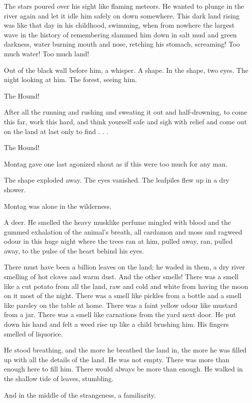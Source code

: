 \documentclass[11pt,openany]{book}
\begin{document}
The stars poured over his sight like flaming meteors. He wanted to plunge in the river again and let it idle him safely on down somewhere. This dark land rising was like that day in his childhood, swimming, when from nowhere the largest wave in the history of remembering slammed him down in salt mud and green darkness, water burning mouth and nose, retching his stomach, screaming! Too much water! Too much land!

Out of the black wall before him, a whisper. A shape. In the shape, two eyes. The night looking at him. The forest, seeing him.

The Hound!

After all the running and rushing and sweating it out and half-drowning, to come this far, work this hard, and think yourself safe and sigh with relief and come out on the land at last only to find . . .

The Hound!

Montag gave one last agonized shout as if this were too much for any man.

The shape exploded away. The eyes vanished. The leafpiles flew up in a dry shower.

Montag was alone in the wilderness.

A deer. He smelled the heavy musklike perfume mingled with blood and the gummed exhalation of the animal's breath, all cardamon and moss and ragweed odour in this huge night where the trees ran at him, pulled away, ran, pulled away, to the pulse of the heart behind his eyes.

There must have been a billion leaves on the land; he waded in them, a dry river smelling of hot cloves and warm dust. And the other smells! There was a smell like a cut potato from all the land, raw and cold and white from having the moon on it most of the night. There was a smell like pickles from a bottle and a smell like parsley on the table at home. There was a faint yellow odour like mustard from a jar. There was a smell like carnations from the yard next door. He put down his hand and felt a weed rise up like a child brushing him. His fingers smelled of liquorice.

He stood breathing, and the more he breathed the land in, the more he was filled up with all the details of the land. He was not empty. There was more than enough here to fill him. There would always be more than enough. He walked in the shallow tide of leaves, stumbling.

And in the middle of the strangeness, a familiarity.
\end{document}
